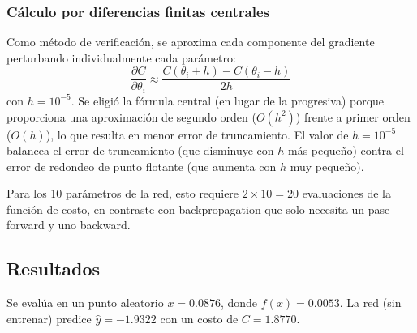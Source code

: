 \documentclass{article}
\begin{document}
\subsubsection{Cálculo por diferencias finitas centrales}

Como método de verificación, se aproxima cada componente del gradiente perturbando individualmente cada parámetro:
\[
    \frac{\partial C}{\partial \theta_i} \approx \frac{C(\theta_i + h) - C(\theta_i - h)}{2h}
\]
con $h = 10^{-5}$. Se eligió la fórmula central (en lugar de la progresiva) porque proporciona una aproximación de segundo orden ($O(h^2)$) frente a primer orden ($O(h)$), lo que resulta en menor error de truncamiento. El valor de $h = 10^{-5}$ balancea el error de truncamiento (que disminuye con $h$ más pequeño) contra el error de redondeo de punto flotante (que aumenta con $h$ muy pequeño).

Para los 10 parámetros de la red, esto requiere $2 \times 10 = 20$ evaluaciones de la función de costo, en contraste con backpropagation que solo necesita un pase forward y uno backward.

\subsection{Resultados}

Se evalúa en un punto aleatorio $x = 0.0876$, donde $f(x) = 0.0053$. La red (sin entrenar) predice $\hat{y} = -1.9322$ con un costo de $C = 1.8770$.
\end{document}
